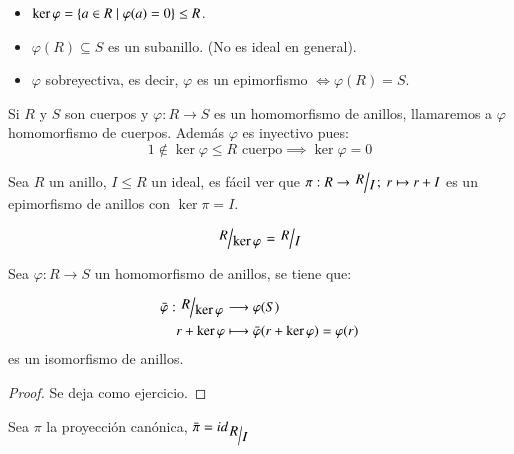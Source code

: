 \begin{obs}$ $
    \begin{itemize}
        \item $\ker{\varphi} = \left\{a \in R \mid \varphi(a) = 0\right\} \leq R$.
        \item $\varphi(R) \subseteq S $ es un subanillo. (No es ideal en general).
        \item $\varphi$ sobreyectiva, es decir, $\varphi$ es un epimorfismo $\iff \varphi(R) = S$.
    \end{itemize}
\end{obs}

\begin{obs}
    Si $R$ y $S$ son cuerpos y $\varphi: R \to S$ es un homomorfismo de anillos, llamaremos a $\varphi$ homomorfismo de cuerpos. Además $\varphi$ es inyectivo pues:
    $$
        1 \notin \ker{\varphi} \leq R \text{ cuerpo} \implies \ker{\varphi} = 0
    $$
\end{obs}

\begin{eg}
    Sea $R$ un anillo, $I \leq R$ un ideal, es fácil ver que $\pi: R \to \quo{R}{I};\ r \mapsto r + I$ es un epimorfismo de anillos con $\ker{\pi} = I$.
\end{eg}

\begin{obs}
    $$\quo{R}{\ker{\varphi}} = \quo{R}{I}$$
\end{obs}

\begin{thm}
    Sea $\varphi: R \to S$ un homomorfismo de anillos, se tiene que:

    \begin{align*}
        \bar{\varphi}: \quo{R}{\ker \varphi} &\longrightarrow \varphi(S)\\
        r + \ker \varphi &\longmapsto \bar{\varphi}(r + \ker \varphi) = \varphi(r)
    \end{align*}
    es un isomorfismo de anillos.
\end{thm}

\begin{proof}
    Se deja como ejercicio.
\end{proof}

\begin{obs}
    Sea $\pi$ la proyección canónica, $\bar{\pi} = id_{\quo{R}{I}}$
\end{obs}


